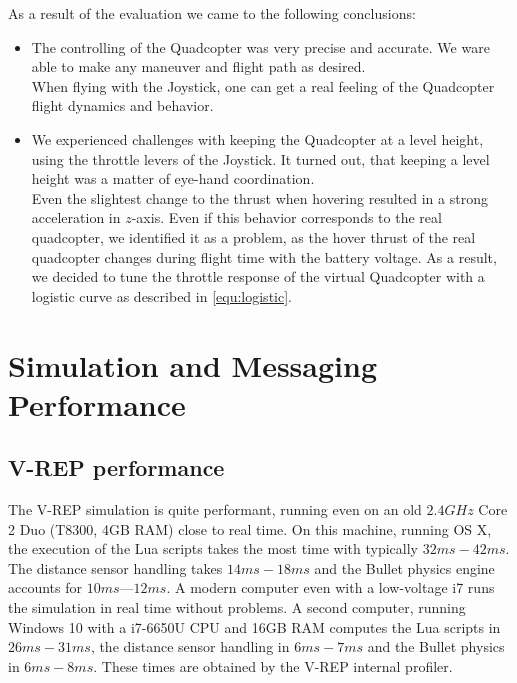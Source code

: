 As a result of the evaluation we came to the following conclusions:

\begin{itemize}
\item{The controlling of the Quadcopter was very precise and accurate. 
We ware able to make any maneuver and flight path as desired. \\ 

When flying with the Joystick, one can get a real feeling of the Quadcopter flight dynamics and behavior}.

\item{We experienced challenges with keeping the Quadcopter at a level height, using the throttle levers of the Joystick. 
It turned out, that keeping a level height was a matter of eye-hand coordination. \\

Even the slightest change to the thrust when hovering resulted in a strong acceleration in $z$-axis. 
Even if this behavior corresponds to the real quadcopter, we identified it as a problem, as the hover thrust of the real quadcopter changes during flight time with the battery voltage. 
As a result, we decided to tune the throttle response of the virtual Quadcopter with a logistic curve as described in \ref{equ:logistic}}.

\end{itemize}

\section{Simulation and Messaging  Performance}
\label{sec:performance}
\subsection{V-REP performance}
 The V-REP simulation is quite performant, running even on an old $2.4 GHz$ Core 2 Duo (T8300, 4GB RAM) close to real time.
 On this machine, running OS X, the execution of the Lua scripts takes the most time with typically $32ms - 42ms$.
 The distance sensor handling takes $14ms - 18ms$ and the Bullet physics engine accounts for $10ms — 12ms$.
 A modern computer even with a low-voltage i7 runs the simulation in real time without problems. A second computer, running Windows 10 with a i7-6650U CPU and 16GB RAM computes the Lua scripts in $26ms - 31ms$, the distance sensor handling in $6ms - 7ms$ and the Bullet physics in $6ms - 8ms$.
 These times are obtained by  the V-REP internal profiler.
 
